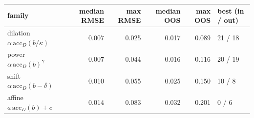 \begin{tabular}{lrrrrl}
\toprule
family & median RMSE & max RMSE & median OOS & max OOS & best (in / out) \\
\midrule
dilation $\alpha\,\mathrm{acc}_D(b/\kappa)$ & 0.007 & 0.025 & 0.017 & 0.089 & 21 / 18 \\
power $\alpha\,\mathrm{acc}_D(b)^\gamma$ & 0.007 & 0.044 & 0.016 & 0.116 & 20 / 19 \\
shift $\alpha\,\mathrm{acc}_D(b-\delta)$ & 0.010 & 0.055 & 0.025 & 0.150 & 10 / 8 \\
affine $a\,\mathrm{acc}_D(b)+c$ & 0.014 & 0.083 & 0.032 & 0.201 & 0 / 6 \\
\bottomrule
\end{tabular}

